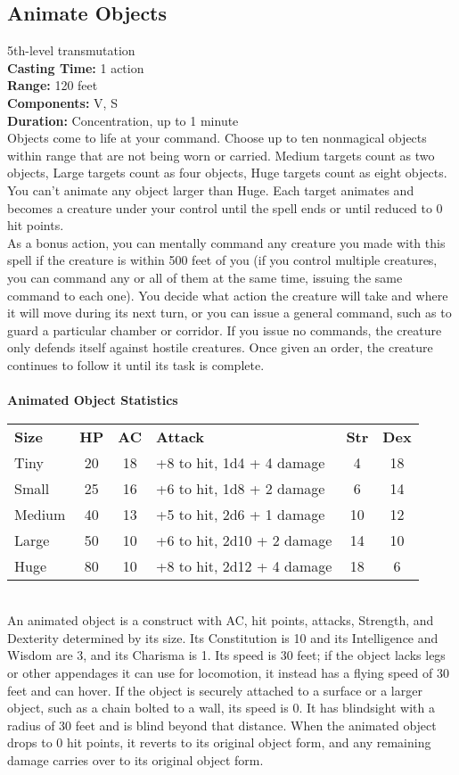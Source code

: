 \documentclass[11pt, A4paper, english]{article}
\begin{document}
		\subsection{Animate Objects}
5th-level transmutation \\
\textbf{Casting Time:} 1 action \\
\textbf{Range:} 120 feet \\
\textbf{Components:} V, S \\
\textbf{Duration:} Concentration, up to 1 minute \\
Objects come to life at your command. Choose up to ten nonmagical objects within range that are not being worn or carried. Medium targets count as two objects, Large targets count as four objects, Huge targets count as eight objects. You can’t animate any object larger than Huge. Each target animates and becomes a creature under your control until the spell ends or until reduced to 0 hit points. \\
As a bonus action, you can mentally command any creature you made with this spell if the creature is within 500 feet of you (if you control multiple creatures, you can command any or all of them at the same time, issuing the same command to each one). You decide what action the creature will take and where it will move during its next turn, or you can issue a general command, such as to guard a particular chamber or corridor. If you issue no commands, the creature only defends itself against hostile creatures. Once given an order, the creature continues to follow it until its task is complete. \\
 \\
\textbf{Animated Object Statistics} \\
			\begin{tabular}{lcclcc}
\textbf{Size} & \textbf{HP} & \textbf{AC} & \textbf{Attack} & \textbf{Str} & \textbf{Dex} \\
Tiny & 20 & 18 & +8 to hit, 1d4 + 4 damage & 4 & 18 \\
Small & 25 & 16 & +6 to hit, 1d8 + 2 damage & 6 & 14 \\
Medium & 40 & 13 & +5 to hit, 2d6 + 1 damage & 10 & 12 \\
Large & 50 & 10 & +6 to hit, 2d10 + 2 damage & 14 & 10 \\
Huge & 80 & 10 & +8 to hit, 2d12 + 4 damage & 18 & 6 \\
			\end{tabular} \\
An animated object is a construct with AC, hit points, attacks, Strength, and Dexterity determined by its size. Its Constitution is 10 and its Intelligence and Wisdom are 3, and its Charisma is 1. Its speed is 30 feet; if the object lacks legs or other appendages it can use for locomotion, it instead has a flying speed of 30 feet and can hover. If the object is securely attached to a surface or a larger object, such as a chain bolted to a wall, its speed is 0. It has blindsight with a radius of 30 feet and is blind beyond that distance. When the animated object drops to 0 hit points, it reverts to its original object form, and any remaining damage carries over to its original object form. \\
\end{document}
